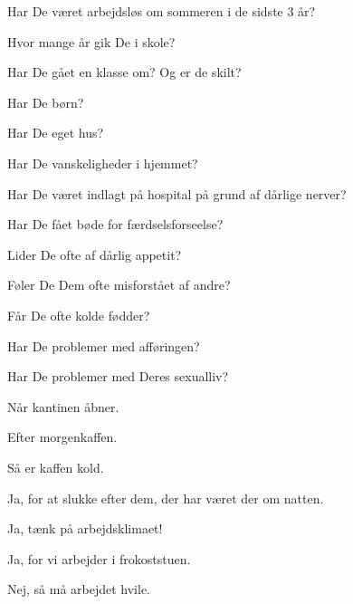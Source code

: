 \documentclass[a4paper,11pt]{article}
\begin{document}
\begin{sketch}

 Har De været arbejdsløs om sommeren i de sidste 3 år?

 Hvor mange år gik De i skole?

 Har De gået en klasse om?  Og er de skilt?

 Har De børn?

 Har De eget hus?

 Har De vanskeligheder i hjemmet?

 Har De været indlagt på hospital på grund af dårlige nerver?

 Har De fået bøde for færdselsforseelse?

 Lider De ofte af dårlig appetit?

 Føler De Dem ofte misforstået af andre?

 Får De ofte kolde fødder?

 Har De problemer med afføringen?

 Har De problemer med Deres sexualliv?


 Når kantinen åbner.

 Efter morgenkaffen.

 Så er kaffen kold.

 Ja, for at slukke efter dem, der har været der om natten.

 Ja, tænk på arbejdsklimaet!

 Ja, for vi arbejder i frokoststuen.

 Nej, så må arbejdet hvile.

\end{sketch}
\end{document}
